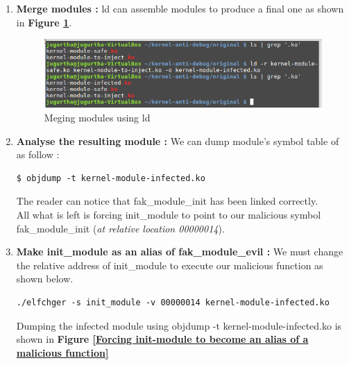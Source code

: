 \begin{enumerate}
	\item \textbf{Merge modules : } ld can assemble modules to produce a final one as shown in \textbf{Figure \ref{Meging modules using ld}}.
    		\begin{figure}[H]
					\centering
        			\includegraphics[scale=0.45]{img/solution/combining-modules-linux.png}
        			\caption{Meging modules using ld}
        			\label{Meging modules using ld}
   			 \end{figure}	
	
	
	
	\item \textbf{Analyse the resulting module :} We can dump module's symbol table of as follow :
\begin{lstlisting}[style=BashInputStyle]
$ objdump -t kernel-module-infected.ko
\end{lstlisting}

The reader can notice that \og fak\_module\_init \fg has been linked correctly.\\
All what is left is forcing \og init\_module \fg to point to our malicious symbol \og fak\_module\_init \fg (\emph{at relative location 00000014}).

\item \textbf{Make init\_module as an alias of fak\_module\_evil : } We must change the relative address of init\_module to execute our malicious function as shown below.
\begin{lstlisting}[style=BashInputStyle]
./elfchger -s init_module -v 00000014 kernel-module-infected.ko
\end{lstlisting}

Dumping the infected module using \og objdump -t kernel-module-infected.ko \fg is shown in \textbf{Figure \ref{Forcing init-module to become an alias of a malicious function}}


\end{enumerate}
